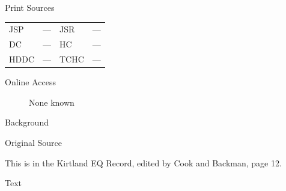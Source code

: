 			\begin{description}
					\item[Print Sources]
				\end{description}

					\begin{tabular}{p{0.5in}p{1in}p{0.5in}p{1in}}
					JSP	 	& ---				& JSR 		& --- \\
					DC	 	& ---				& HC 		& --- \\
					HDDC 	& ---				& TCHC 		& --- \\
					\end{tabular}
				
				\begin{description}
					\item[Online Access] None known %
				\end{description}
				
				\begin{description}
					\item[Background]
				\end{description}
				
				
				\begin{description}
					\item[Original Source]
				\end{description}
				
					
					This is in the Kirtland EQ Record, edited by Cook and Backman, page 12.
				
				\begin{description}
					\item[Text]
				\end{description}
				
